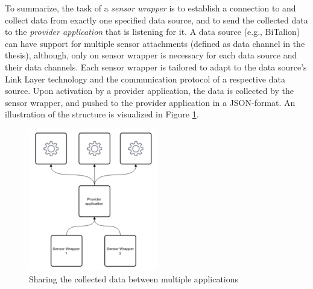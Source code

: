 


To summarize, the task of a \textit{sensor wrapper} is to establish a connection to and collect data from exactly one specified data source, and to send the collected data to the \textit{provider application} that is listening for it. A data source (e.g., BiTalion) can have support for multiple sensor attachments (defined as data channel in the thesis), although, only on sensor wrapper is necessary for each data source and their data channels. Each sensor wrapper is tailored to adapt to the data source's Link Layer technology and the communication protocol of a respective data source. Upon activation by a provider application, the data is collected by the sensor wrapper, and pushed to the provider application in a JSON-format. An illustration of the structure is visualized in Figure \ref{fig:provider_SW}.

\begin{figure}
    \centering
    \includegraphics[width=0.5\textwidth]{images/provider_SW.png}
    \caption{Sharing the collected data between multiple applications \cite{gjoby}}
    \label{fig:provider_SW}
\end{figure}